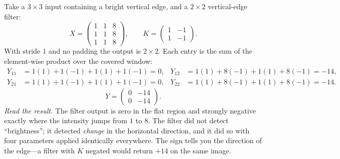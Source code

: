 \begin{workedexample}
Take a $3\times3$ input containing a bright vertical edge, and a $2\times2$
vertical-edge filter:
\[
  X = \begin{pmatrix}
    1 & 1 & 8\\ 1 & 1 & 8\\ 1 & 1 & 8
  \end{pmatrix},
  \qquad
  K = \begin{pmatrix} 1 & -1\\ 1 & -1 \end{pmatrix}.
\]
With stride $1$ and no padding the output is $2\times2$. Each entry is the sum
of the element-wise product over the covered window:
\[
\begin{aligned}
  Y_{11} &= 1(1) + 1(-1) + 1(1) + 1(-1) = 0, &
  Y_{12} &= 1(1) + 8(-1) + 1(1) + 8(-1) = -14,\\
  Y_{21} &= 1(1) + 1(-1) + 1(1) + 1(-1) = 0, &
  Y_{22} &= 1(1) + 8(-1) + 1(1) + 8(-1) = -14.
\end{aligned}
\]
\[
  Y = \begin{pmatrix} 0 & -14\\ 0 & -14 \end{pmatrix}.
\]
\emph{Read the result.} The filter output is zero in the flat region and
strongly negative exactly where the intensity jumps from $1$ to $8$. The filter
did not detect ``brightness''; it detected \emph{change} in the horizontal
direction, and it did so with four parameters applied identically everywhere.
The sign tells you the direction of the edge---a filter with $K$ negated would
return $+14$ on the same image.
\end{workedexample}

